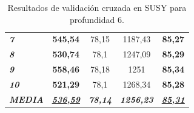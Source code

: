 \begin{table}[ht]
\begin{tabular}{@{}l|cc|cc|@{}}
\textit{\textbf{7}}          & \textbf{545,54}                                  & 78,15                                                 & 1187,43                                          & \textbf{85,27}                                        \\
\textit{\textbf{8}}          & \textbf{530,74}                                  & 78,1                                                  & 1247,09                                          & \textbf{85,29}                                        \\
\textit{\textbf{9}}          & \textbf{558,46}                                  & 78,18                                                 & 1251                                             & \textbf{85,34}                                        \\
\textit{\textbf{10}}         & \textbf{521,29}                                  & 78,1                                                  & 1268,34                                          & \textbf{85,28}                                        \\ \midrule
\textit{\textbf{MEDIA}}      & {\ul \textit{\textbf{536,59}}}                   & \textit{\textbf{78,14}}                               & \textit{\textbf{1256,23}}                        & {\ul \textit{\textbf{85,31}}}                         \\ \bottomrule
\end{tabular}
\caption{Resultados de validación cruzada en SUSY para profundidad 6.}
\label{tab:susyprof6}
\end{table}

